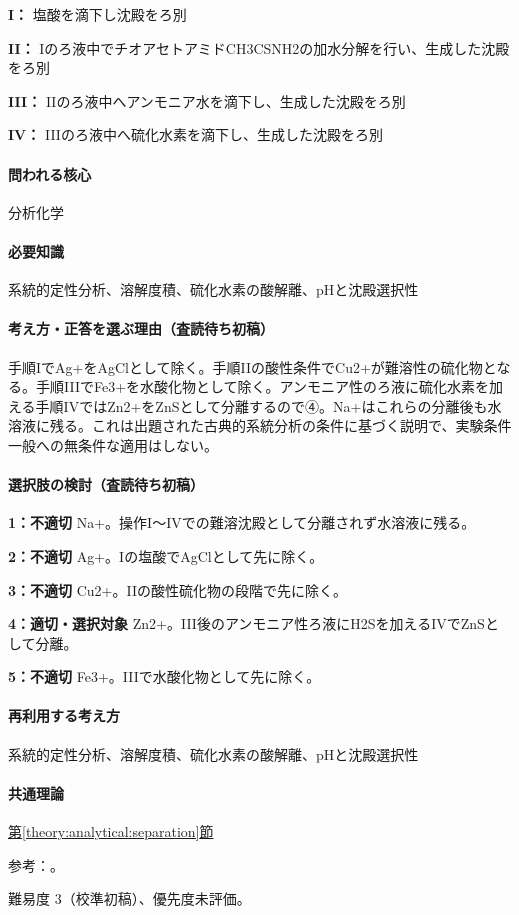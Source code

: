 \noindent\textbf{I：} 塩酸を滴下し沈殿をろ別\par

\noindent\textbf{II：} Iのろ液中でチオアセトアミドCH3CSNH2の加水分解を行い、生成した沈殿をろ別\par

\noindent\textbf{III：} IIのろ液中へアンモニア水を滴下し、生成した沈殿をろ別\par

\noindent\textbf{IV：} IIIのろ液中へ硫化水素を滴下し、生成した沈殿をろ別\par

\paragraph{問われる核心} 分析化学

\paragraph{必要知識} 系統的定性分析、溶解度積、硫化水素の酸解離、pHと沈殿選択性

\paragraph{考え方・正答を選ぶ理由（査読待ち初稿）} 手順IでAg+をAgClとして除く。手順IIの酸性条件でCu2+が難溶性の硫化物となる。手順IIIでFe3+を水酸化物として除く。アンモニア性のろ液に硫化水素を加える手順IVではZn2+をZnSとして分離するので④。Na+はこれらの分離後も水溶液に残る。これは出題された古典的系統分析の条件に基づく説明で、実験条件一般への無条件な適用はしない。

\paragraph{選択肢の検討（査読待ち初稿）}\mbox{}\par

\noindent\textbf{1：不適切} Na+。操作I〜IVでの難溶沈殿として分離されず水溶液に残る。\par

\noindent\textbf{2：不適切} Ag+。Iの塩酸でAgClとして先に除く。\par

\noindent\textbf{3：不適切} Cu2+。IIの酸性硫化物の段階で先に除く。\par

\noindent\textbf{4：適切・選択対象} Zn2+。III後のアンモニア性ろ液にH2Sを加えるIVでZnSとして分離。\par

\noindent\textbf{5：不適切} Fe3+。IIIで水酸化物として先に除く。\par

\paragraph{再利用する考え方} 系統的定性分析、溶解度積、硫化水素の酸解離、pHと沈殿選択性

\paragraph{共通理論} \hyperref[theory:analytical:separation]{第\ref*{theory:analytical:separation}節}

\par 参考：\cite{qualitative_stanford}。

\par 難易度 3（校準初稿）、優先度未評価。
